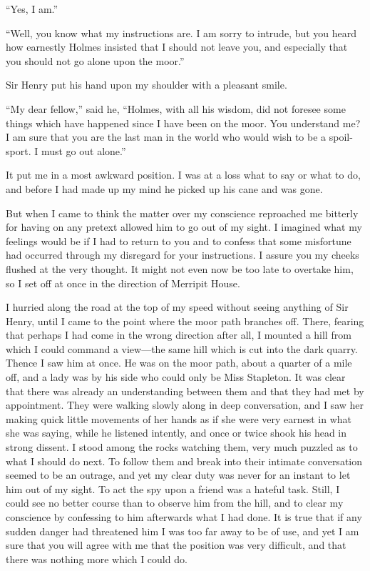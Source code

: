 \documentclass[paper=5.5in:8.5in,BCOR=7mm,twoside,DIV=calc,12pt,usegeometry,openany,chapterprefix,endperiod]{scrbook} %
\begin{document}
\enquote{Yes, I am.}

\enquote{Well, you know what my instructions are. I am sorry to intrude, but you heard how earnestly Holmes insisted that I should not leave you, and especially that you should not go alone upon the moor.}

Sir Henry put his hand upon my shoulder with a pleasant smile.

\enquote{My dear fellow,} said he, \enquote{Holmes, with all his wisdom, did not foresee some things which have happened since I have been on the moor. You understand me? I am sure that you are the last man in the world who would wish to be a spoil-sport. I must go out alone.}

It put me in a most awkward position. I was at a loss what to say or what to do, and before I had made up my mind he picked up his cane and was gone.

But when I came to think the matter over my conscience reproached me bitterly for having on any pretext allowed him to go out of my sight. I imagined what my feelings would be if I had to return to you and to confess that some misfortune had occurred through my disregard for your instructions. I assure you my cheeks flushed at the very thought. It might not even now be too late to overtake him, so I set off at once in the direction of Merripit House.


I hurried along the road at the top of my speed without seeing anything of Sir Henry, until I came to the point where the moor path branches off. There, fearing that perhaps I had come in the wrong direction after all, I mounted a hill from which I could command a view\nobreakdash---the same hill which is cut into the dark quarry. Thence I saw him at once. He was on the moor path, about a quarter of a mile off, and a lady was by his side who could only be Miss Stapleton. It was clear that there was already an understanding between them and that they had met by appointment. They were walking slowly along in deep conversation, and I saw her making quick little movements of her hands as if she were very earnest in what she was saying, while he listened intently, and once or twice shook his head in strong dissent. I stood among the rocks watching them, very much puzzled as to what I should do next. To follow them and break into their intimate conversation seemed to be an outrage, and yet my clear duty was never for an instant to let him out of my sight. To act the spy upon a friend was a hateful task. Still, I could see no better course than to observe him from the hill, and to clear my conscience by confessing to him afterwards what I had done. It is true that if any sudden danger had threatened him I was too far away to be of use, and yet I am sure that you will agree with me that the position was very difficult, and that there was nothing more which I could do.
\end{document}
